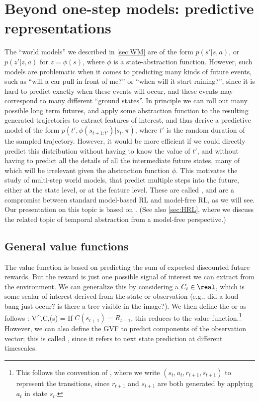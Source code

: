 \section{Beyond one-step models: predictive representations}
\label{sec:beyond}
\label{sec:successor}


The ``world models'' we described in \cref{sec:WM}
are  of the form $p(s'|s,a)$,
or $p(z'|z,a)$ for $z=\phi(s)$, where $\phi$ is a state-abstraction
function.
However, such models are problematic when it comes to predicting
many kinds of future events, such as ``will a car pull in front of me?''
or ``when will it start raining?'',
since it is hard to predict exactly when these events will occur,
and these events may correspond to many different ``ground states''.
In principle we can roll out many possible long term futures,
and apply some abstraction function to  the resulting
generated trajectories to extract features of interest,
and thus derive a predictive model of the form $p(t', \phi(s_{t+1:t'})|s_t,\pi)$,
where $t'$ is the random duration of the sampled trajectory.
However, it would be more
efficient if we could directly predict this distribution
without having to know the value of $t'$,
and without having to predict all the details of all the
intermediate future states,
many of which will be irrelevant given the abstraction function $\phi$.
This motivates the study of multi-step world models,
that predict multiple steps into the future,
either at the state level, or at the feature level.
These are called ,
and are a compromise between standard model-based RL
and model-free RL, as we will see.
Our presentation on this topic is based on 
\citep{Carvalho2024}.
(See also \cref{sec:HRL}, where we discuss the related topic
of temporal abstraction from a model-free perspective.)

\subsection{General value functions}
\label{sec:GVF}

The value function is based on  predicting the sum of expected
discounted future rewards.
But the reward is just one possible signal of interest we can extract from the environment.
We can generalize this by considering a 
$C_t \in \real$, which is some scalar of interest derived from the state or observation
(e.g., did a loud bang just occur? is there a tree visible in the image?).
We then define the  or 
as follows \citep{GVF}:
\be
V^{\pi,C,\gamma}(s) = 
\ee
If $C(s_{t+1})=R_{t+1}$, this reduces to the value function.\footnote{
%
This follows the convention  of \citep{Suttonv2},
where we write $(s_t, a_t, r_{t+1}, s_{t+1})$
to represent the transitions, since
$r_{t+1}$ and $s_{t+1}$ are both generated
by applying $a_t$ in state $s_t$.
}
However, we can also define the GVF to predict components
of the observation vector; this is called  \citep{Modayil2014},
since it refers to next state prediction at different timescales.

